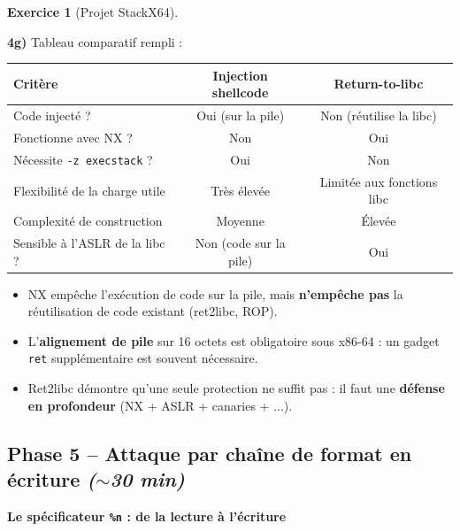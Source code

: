\documentclass[a4paper,11pt]{article}
\theoremstyle{plain}
\theoremstyle{definition}
\newtheorem{exercice}{Exercice}
\begin{document}
\begin{exercice}[Projet StackX64]
\begin{correction}
\textbf{4g)} Tableau comparatif rempli :
\begin{center}
\begin{tabular}{lcc}
\toprule
\textbf{Critère} & \textbf{Injection shellcode} & \textbf{Return-to-libc} \\
\midrule
Code injecté ? & Oui (sur la pile) & Non (réutilise la libc) \\
Fonctionne avec NX ? & Non & Oui \\
Nécessite \texttt{-z execstack} ? & Oui & Non \\
Flexibilité de la charge utile & Très élevée & Limitée aux fonctions libc \\
Complexité de construction & Moyenne & Élevée \\
Sensible à l'ASLR de la libc ? & Non (code sur la pile) & Oui \\
\bottomrule
\end{tabular}
\end{center}

\begin{pointcle}
\begin{itemize}
    \item NX empêche l'exécution de code sur la pile, mais \textbf{n'empêche pas} la réutilisation de code existant (ret2libc, ROP).
    \item L'\textbf{alignement de pile} sur 16 octets est obligatoire sous x86-64 : un gadget \texttt{ret} supplémentaire est souvent nécessaire.
    \item Ret2libc démontre qu'une seule protection ne suffit pas : il faut une \textbf{défense en profondeur} (NX + ASLR + canaries + ...).
\end{itemize}
\end{pointcle}

\end{correction}



\subsection*{Phase 5 -- Attaque par chaîne de format en écriture \hfill\normalfont\textit{($\sim$30 min)}}

\begin{rappel}
\textbf{Le spécificateur \texttt{\%n} : de la lecture à l'écriture}


\end{rappel}
\end{exercice}
\end{document}
